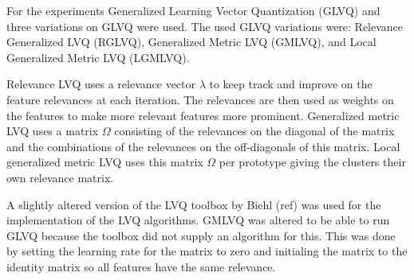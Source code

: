 For the experiments Generalized Learning Vector Quantization (GLVQ) and three variations on GLVQ were used. The used GLVQ variations were: Relevance Generalized LVQ (RGLVQ), Generalized Metric LVQ (GMLVQ), and Local Generalized Metric LVQ (LGMLVQ).

Relevance LVQ uses a relevance vector $\lambda$ to keep track and improve on the feature relevances at each iteration. The relevances are then used as weights on the features to make more relevant features more prominent. Generalized metric LVQ uses a matrix $\Omega$  consisting of the relevances on the diagonal of the matrix and the combinations of the relevances on the off-diagonals of this matrix. Local generalized metric LVQ uses this matrix $\Omega$ per prototype giving the clusters their own relevance matrix.

A slightly altered version of the LVQ toolbox by Biehl (ref)  was used for the implementation of the LVQ algorithms. GMLVQ was altered to be able to run GLVQ because the toolbox did not supply an algorithm for this. This was done by setting the learning rate for the matrix to zero and initialing the matrix to the identity matrix so all features have the same relevance.



